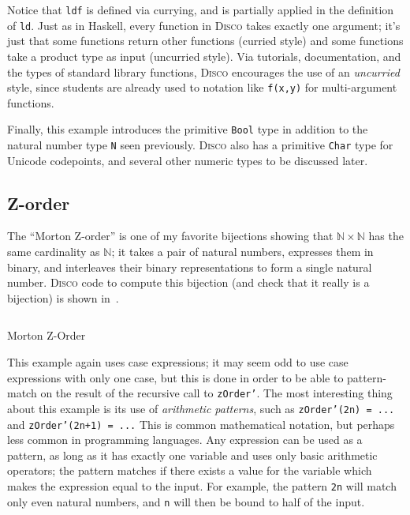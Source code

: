 \documentclass[submission,copyright,creativecommons]{eptcs}
\newcommand{\disco}{\textsc{Disco}\xspace}
\newcommand{\pref}[1]{\prettyref{#1}}
\newcommand{\N}{\mathbb{N}}
\begin{document}
Notice that \verb|ldf| is defined via currying, and is partially
applied in the definition of \verb|ld|. Just as in Haskell, every
function in \disco takes exactly one argument; it's just that some
functions return other functions (curried style) and some functions
take a product type as input (uncurried style).  Via tutorials,
documentation, and the types of standard library functions, \disco
encourages the use of an \emph{uncurried} style, since students are
already used to notation like \verb|f(x,y)| for multi-argument
functions.

Finally, this example introduces the primitive \verb|Bool| type in
addition to the natural number type \verb|N| seen previously.  \disco
also has a primitive \verb|Char| type for Unicode codepoints, and
several other numeric types to be discussed later.

\subsection{Z-order}
\label{sec:zorder}

The ``Morton Z-order'' is one of my favorite bijections showing that
$\N \times \N$ has the same cardinality as $\N$; it takes a pair of
natural numbers, expresses them in binary, and interleaves their
binary representations to form a single natural number.  \disco code
to compute this bijection (and check that it really is a bijection) is
shown in~\pref{lst:zorder}.

\begin{listing}[!htp]
\inputminted{text}{examples/zorder.disco}
\caption{Morton Z-Order}
\label{lst:zorder}
\end{listing}

This example again uses case expressions; it may seem odd to use case
expressions with only one case, but this is done in order to be able
to pattern-match on the result of the recursive call to
\texttt{zOrder'}.  The most interesting thing about this example is
its use of \emph{arithmetic patterns}, such as \texttt{zOrder'(2n) =
  ...}  and \texttt{zOrder'(2n+1) = ...}  This is common mathematical
notation, but perhaps less common in programming languages.  Any
expression can be used as a pattern, as long as it has exactly one
variable and uses only basic arithmetic operators; the pattern matches
if there exists a value for the variable which makes the expression
equal to the input.  For example, the pattern \texttt{2n} will match
only even natural numbers, and \texttt{n} will then be bound to half
of the input.
\end{document}
